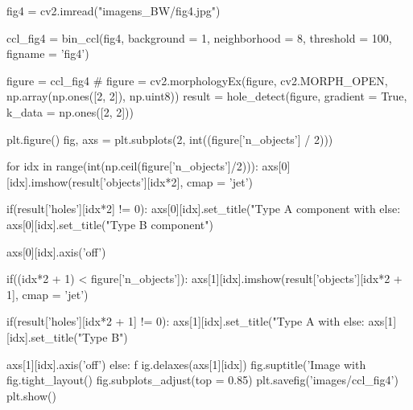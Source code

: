 \documentclass{article}
\begin{document}
\begin{python}
fig4 = cv2.imread("imagens_BW/fig4.jpg")

ccl_fig4 = bin_ccl(fig4, background = 1, neighborhood = 8, threshold = 100, figname = 'fig4')

figure = ccl_fig4
# figure = cv2.morphologyEx(figure, cv2.MORPH_OPEN, np.array(np.ones([2, 2]), np.uint8))
result = hole_detect(figure, gradient = True, k_data = np.ones([2, 2]))

plt.figure()
fig, axs = plt.subplots(2, int((figure['n_objects'] / 2)))

for idx in range(int(np.ceil(figure['n_objects']/2))):
axs[0][idx].imshow(result['objects'][idx*2], cmap = 'jet')
	
	if(result['holes'][idx*2] != 0):
		axs[0][idx].set_title("Type A component with %
	else:
		axs[0][idx].set_title("Type B component")
	
	axs[0][idx].axis('off')
	
	if((idx*2 + 1) < figure['n_objects']):
		axs[1][idx].imshow(result['objects'][idx*2 + 1], cmap = 'jet')
		
		if(result['holes'][idx*2 + 1] != 0):
			axs[1][idx].set_title("Type A with %
		else:
			axs[1][idx].set_title("Type B")        
	
		axs[1][idx].axis('off')
	else:
	f	ig.delaxes(axs[1][idx])
fig.suptitle('Image with %
fig.tight_layout()
fig.subplots_adjust(top = 0.85)
plt.savefig('images/ccl_fig4')
plt.show()

\end{python}
\end{document}
